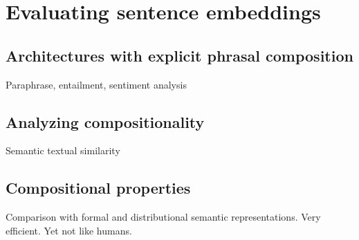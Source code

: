 \setchapterpreamble[u]{\margintoc}
\chapter{Evaluating sentence embeddings}


\section{Architectures with explicit phrasal composition}

Paraphrase, entailment, sentiment analysis

\section{Analyzing compositionality}

Semantic textual similarity

\section{Compositional properties}

Comparison with formal and distributional semantic representations. Very efficient. Yet not like humans.
